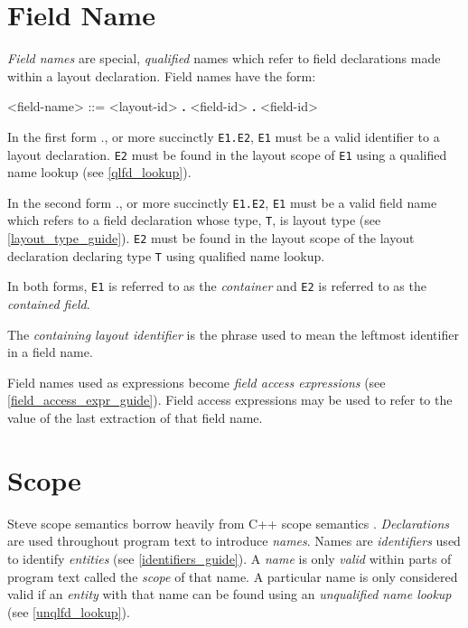 \section{Field Name} \label{field_name_guide}

\textit{Field names} are special, \textit{qualified} names which refer to field declarations made within a layout declaration. Field names have the form:

\begin{minip}
\begin{grammar}
<field-name> ::=
<layout-id> \textbf{.} <field-id>
 \textbf{.} <field-id>
\end{grammar}
\end{minip}

In the first form ., or more succinctly \texttt{E1.E2}, \texttt{E1} must be a valid identifier to a layout declaration. \texttt{E2} must be found in the layout scope of \texttt{E1} using a qualified name lookup (see \ref{qlfd_lookup}).

In the second form ., or more succinctly \texttt{E1.E2}, \texttt{E1} must be a valid field name which refers to a field declaration whose type, \texttt{T}, is layout type (see \ref{layout_type_guide}). \texttt{E2} must be found in the layout scope of the layout declaration declaring type \texttt{T} using qualified name lookup.

In both forms, \texttt{E1} is referred to as the \textit{container} and \texttt{E2} is referred to as the \textit{contained field}.

The \textit{containing layout identifier} is the phrase used to mean the leftmost identifier in a field name.

Field names used as expressions become \textit{field access expressions} (see \ref{field_access_expr_guide}). Field access expressions may be used to refer to the value of the last extraction of that field name.

\section{Scope} \label{scope_guide}

Steve scope semantics borrow heavily from C++ scope semantics \cite{cpp_std}. \textit{Declarations} are used throughout program text to introduce \textit{names}. Names are \textit{identifiers} used to identify \textit{entities} (see \ref{identifiers_guide}). A \textit{name} is only \textit{valid} within parts of program text called the \textit{scope} of that name. A particular name is only considered valid if an \textit{entity} with that name can be found using an \textit{unqualified name lookup} (see \ref{unqlfd_lookup}).

